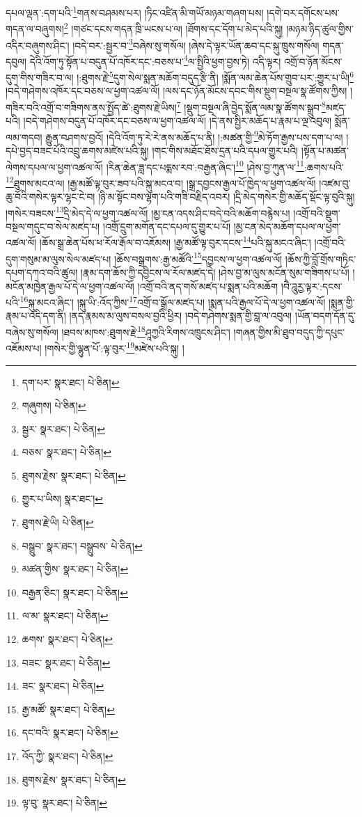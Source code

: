 དཔལ་ལྡན་:དག་པའི་\footnote{དག་པར་  སྣར་ཐང་།  པེ་ཅིན། }གནས་བཤམས་པར། །ཏིང་འཛིན་མི་གཡོ་མཉམ་གཞག་པས། །དགེ་བར་དགོངས་པས་གདན་ལ་བཞུགས།\footnote{གཞུགས།  པེ་ཅིན། } །གཙང་དངས་གདན་ཁྲི་ཡངས་པ་ལ། །ཐོགས་དང་དོག་པ་མེད་པའི་སྐུ། །མཉམ་ཉིད་ཚུལ་གྱིས་འདིར་བཞུགས་ཤིང་། །བདེ་བར་:སྦྱར་བ་\footnote{སྦྱར་  སྣར་ཐང་།  པེ་ཅིན། }བཞེས་སུ་གསོལ། །ཞེས་དེ་ལྟར་ཡོན་ཆབ་དང་སྐུ་ཁྲུས་གསོལ། གདན་དབུལ། དེའི་འོག་ཏུ་སྟོན་པ་བདུན་པོ་འཁོར་དང་:བཅས་པ་\footnote{བཅས་  སྣར་ཐང་།  པེ་ཅིན། }ལ་སྤྱིའི་ཕྱག་བྱས་ཏེ། འདི་ལྟར། འགྲོ་བ་ཉོན་མོངས་དུག་གིས་གཟིར་བ་ལ། །:ཐུགས་རྗེ་\footnote{ཐུགས་རྗེས་  སྣར་ཐང་།  པེ་ཅིན། }དུག་སེལ་སྨན་མཆོག་བདུད་རྩི་ནི། །སྨོན་ལམ་ཆེན་པོས་གྲུབ་པར་:གྱུར་པ་ཡི།\footnote{གྱུར་པ་ཡིས།  སྣར་ཐང་། } །བདེ་གཤེགས་འཁོར་དང་བཅས་ལ་ཕྱག་འཚལ་ལོ། །ལས་དང་ཉོན་མོངས་དབང་གིས་སྡུག་བསྔལ་སྣ་ཚོགས་ཀྱིས། །གཟིར་བའི་འགྲོ་བ་གཟིགས་ནས་སྤྱོད་ཚེ་:ཐུགས་རྗེ་ཡིས།\footnote{ཐུགས་རྗེ་ཡི།  པེ་ཅིན། } །སྡུག་བསྔལ་ཞི་བྱེད་སྨོན་ལམ་སྣ་ཚོགས་སྒྲུབ་\footnote{བསྒྲུབ་  སྣར་ཐང་། བསྒྲུབས་  པེ་ཅིན། }མཛད་པའི། །བདེ་གཤེགས་བདུན་པོ་འཁོར་དང་བཅས་ལ་ཕྱག་འཚལ་ལོ། །དེ་ནས་སྤྱིར་མཆོད་པ་རྣམ་པ་ལྔ་འབུལ། སྨོན་ལམ་གདབ། རྒྱུན་བཤགས་བྱའོ། །དེའི་འོག་ཏུ་རེ་རེ་ནས་མཆོད་པ་ནི། །:མཚན་གྱི་\footnote{མཚན་གྱིས་  སྣར་ཐང་།  པེ་ཅིན། }མེ་ཏོག་རྒྱས་པས་དག་པ་ལ། །དཔེ་བྱད་བཟང་པོའི་འབྲུ་ཆགས་མཛེས་པའི་སྐུ། །གང་གིས་མཐོང་ཐོས་དྲན་པའི་དཔལ་གྱུར་པའི། །སྟོན་པ་མཚན་ལེགས་དཔལ་ལ་ཕྱག་འཚལ་ལོ། །རིན་ཆེན་ཟླ་དང་པདྨས་རབ་:བརྒྱན་ཞིང་།\footnote{བརྒྱན་ཅིང་།  སྣར་ཐང་།  པེ་ཅིན། } །ཤེས་བྱ་ཀུན་ལ་\footnote{ལ་མ་  སྣར་ཐང་།  པེ་ཅིན། }:ཆགས་པའི་\footnote{ཆགས་  སྣར་ཐང་།  པེ་ཅིན། }ཐུགས་མངའ་ལ། །རྒྱ་མཚོ་ལྟ་བུར་ཟབ་པའི་སྐུ་མངའ་བ། །སྒྲ་དབྱངས་རྒྱལ་པོ་ཁྱེད་ལ་ཕྱག་འཚལ་ལོ། །འཛམ་བུ་ཆུ་བོའི་གསེར་ལྟར་ལྷང་ངེ་བ། །ཉི་མ་སྟོང་བས་ལྷག་པའི་གཟི་བརྗིད་འབར། །དྲི་མེད་གསེར་གྱི་མཆོད་སྡོང་ལྟ་བུའི་སྐུ། །གསེར་བཟངས་\footnote{བཟང་  སྣར་ཐང་།  པེ་ཅིན། }དྲི་མེད་དེ་ལ་ཕྱག་འཚལ་ལོ། །མྱ་ངན་འདས་ཤིང་བདེ་བའི་མཆོག་བརྙེས་པ། །འགྲོ་བའི་སྡུག་བསྔལ་གདུང་བ་སེལ་མཛད་པ། །འགྲོ་དྲུག་མགོན་དང་དཔལ་དུ་གྱུར་པ་པོ། །མྱ་ངན་མེད་མཆོག་དཔལ་ལ་ཕྱག་འཚལ་ལོ། །ཆོས་སྒྲ་ཆེན་པོས་ཕ་རོལ་རྒོལ་བ་འཇོམས། །རྒྱ་མཚོ་ལྟ་བུར་དངས་\footnote{ཟང་  སྣར་ཐང་།  པེ་ཅིན། }པའི་སྐུ་མངའ་ཞིང་། །འགྲོ་བའི་དུག་གསུམ་མ་ལུས་སེལ་མཛད་པ། །ཆོས་བསྒྲགས་:རྒྱ་མཚོའི་\footnote{རྒྱ་མཚོ་  སྣར་ཐང་།  པེ་ཅིན། }དབྱངས་ལ་ཕྱག་འཚལ་ལོ། །ཆོས་ཀྱི་བློ་གྲོས་གཏིང་དཔག་དཀའ་བའི་ཚུལ། །རྣམ་དག་ཆོས་ཀྱི་དབྱིངས་ལ་རོལ་མཛད་དེ། །ཤེས་བྱ་མ་ལུས་མངོན་སུམ་གཟིགས་པ་པོ། །མངོན་མཁྱེན་རྒྱལ་པོ་དེ་ལ་ཕྱག་འཚལ་ལོ། །འགྲོ་བའི་ནད་གསོ་མཛད་པ་སྨན་པའི་མཆོག །བཻ་ཌཱུརྱ་ལྟར་:དངས་པའི་\footnote{དང་བའི་  སྣར་ཐང་།  པེ་ཅིན། }སྐུ་མངའ་ཞིང་། །སྐུ་ཡི་:འོད་ཀྱིས་\footnote{འོད་ཀྱི་  སྣར་ཐང་།  པེ་ཅིན། }འགྲོ་བ་སྒྲོལ་མཛད་པ། །སྨན་པའི་རྒྱལ་པོ་དེ་ལ་ཕྱག་འཚལ་ལོ། །སྨན་གྱི་རྣམ་པ་འདི་དག་ནི། །ནད་རྣམས་མ་ལུས་བསལ་བྱའི་ཕྱིར། །བདེ་གཤེགས་སྨན་གྱི་བླ་ལ་འབུལ། །ཡོན་བདག་དོན་དུ་བཞེས་སུ་གསོལ། །ཐབས་མཁས་:ཐུགས་རྗེ་\footnote{ཐུགས་རྗེས་  སྣར་ཐང་།  པེ་ཅིན། }ཤཱཀྱའི་རིགས་འཁྲུངས་ཤིང་། །གཞན་གྱིས་མི་ཐུབ་བདུད་ཀྱི་དཔུང་འཇོམས་པ། །གསེར་གྱི་ལྷུན་པོ་:ལྟ་བུར་\footnote{ལྟ་བུ་  སྣར་ཐང་།  པེ་ཅིན། }མཛེས་པའི་སྐུ། །

